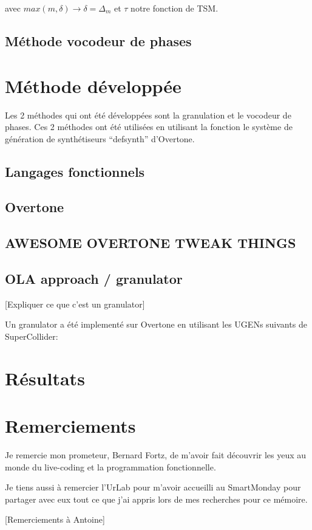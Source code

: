 \documentclass[letterpaper]{article}
\begin{document}
avec $max(m,\delta) \rightarrow \delta=\Delta_m$ et $\tau$ notre fonction de TSM.
\subsection{Méthode vocodeur de phases}

\section{Méthode développée}

Les 2 méthodes qui ont été développées sont la granulation et le vocodeur de phases.
Ces 2 méthodes ont été utilisées en utilisant la fonction le système de génération de
synthétiseurs ``defsynth'' d'Overtone.

\subsection{Langages fonctionnels}

\subsection{Overtone}

\subsection{AWESOME OVERTONE TWEAK THINGS}
\subsection{OLA approach / granulator}
[Expliquer ce que c'est un granulator]

Un granulator a été implementé sur Overtone en utilisant les UGENs suivants
de SuperCollider:


\section{Résultats}

\section{Remerciements}
  Je remercie mon prometeur, Bernard Fortz, de m'avoir fait découvrir
  les yeux au monde du live-coding et la programmation fonctionnelle.

  Je tiens aussi à remercier l'UrLab pour m'avoir accueilli au SmartMonday
  pour partager avec eux tout ce que j'ai appris lors de mes recherches
  pour ce mémoire.

  [Remerciements à Antoine]

\footnotesize



\end{document}
